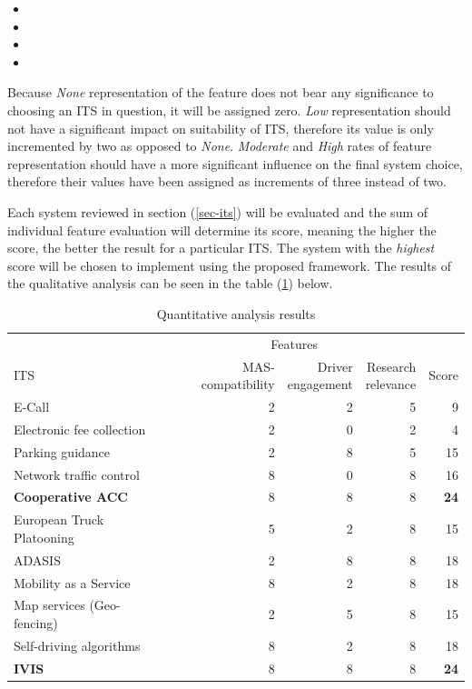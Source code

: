 \documentclass[main.tex]{subfiles}
\begin{document}
\begin{itemize}
    \item {}
    \item {}
    \item {}
    \item {}
\end{itemize}

Because \emph{None} representation of the feature does not bear any significance to choosing an ITS 
in question, it will be assigned zero. \emph{Low} representation should not have a significant impact on 
suitability of ITS, therefore its value is only incremented by two as opposed to \emph{None}. \emph{Moderate}
and \emph{High} rates of feature representation should have a more significant influence on the final system 
choice, therefore their values have been assigned as increments of three instead of two. 

Each system reviewed in section (\ref{sec-its}) will be evaluated and the sum of individual feature evaluation 
will determine its score, meaning the higher the score, the better the result for a particular ITS. The system 
with the \emph{highest} score will be chosen to implement using the proposed framework. The results of the 
qualitative analysis can be seen in the table (\ref{qa-table}) below.

\begin{table}[htbp]
    \caption{Quantitative analysis results}
    \renewcommand{\arraystretch}{1.4}
    \centering\begin{tabular}{l*{3}{r}r} \toprule
         & \multicolumn{3}{c}{Features} & \\ \cmidrule(rl){2-4}
        ITS & \multicolumn{1}{p{6em}}{MAS-compatibility} & \multicolumn{1}{p{6em}}{Driver \newline engagement} & \multicolumn{1}{p{6em}}{Research \newline relevance} & Score \\ \midrule
        E-Call & 2 & 2 & 5 & 9 \\ 
        Electronic fee collection & 2 & 0 & 2 & 4 \\
        Parking guidance & 2 & 8 & 5 & 15 \\
        Network traffic control & 8 & 0 & 8 & 16 \\
        \textbf{Cooperative ACC} & 8 & 8 & 8 & \textbf{24} \\
        European Truck Platooning & 5 & 2 & 8 & 15 \\
        ADASIS & 2 & 8 & 8 & 18 \\
        Mobility as a Service & 8 & 2 & 8 & 18 \\
        Map services (Geo-fencing) & 2 & 5 & 8 & 15 \\
        \multicolumn{1}{p{5em}}{Self-driving algorithms} \& Platooning & 8 & 2 & 8 & 18 \\
        \textbf{IVIS} & 8 & 8 & 8 & \textbf{24} \\ \bottomrule
    \end{tabular}
    \label{qa-table}
\end{table}
\end{document}
